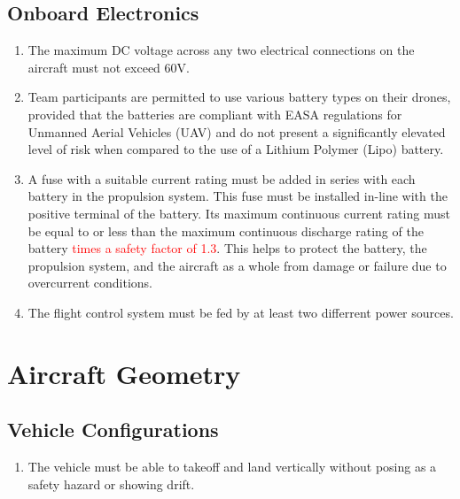 \documentclass{article}
\begin{document}
\subsection{Onboard Electronics}
\begin{enumerate}
  \item The maximum DC voltage across any two electrical connections on the aircraft must not exceed 60V.
  \item Team participants are permitted to use various battery types on their drones, provided that the batteries are compliant with EASA regulations for Unmanned Aerial Vehicles (UAV) and do not present a significantly elevated level of risk when compared to the use of a Lithium Polymer (Lipo) battery. 
  \item A fuse with a suitable current rating must be added in series with each battery in the propulsion system. 
  This fuse must be installed in-line with the positive terminal of the battery. Its maximum continuous current rating must be equal to or less than the maximum continuous discharge rating of the battery \textcolor{red}{times a safety factor of 1.3}. This helps to protect the battery, the propulsion system, and the aircraft as a whole from damage or failure due to overcurrent conditions.
  \item The flight control system must be fed by at least two differrent power sources. 
\end{enumerate}



\section{Aircraft Geometry}

\subsection{Vehicle Configurations}
\begin{enumerate}
  \item The vehicle must be able to takeoff and land vertically without posing as a safety hazard or showing drift.  
\end{enumerate}
\end{document}
